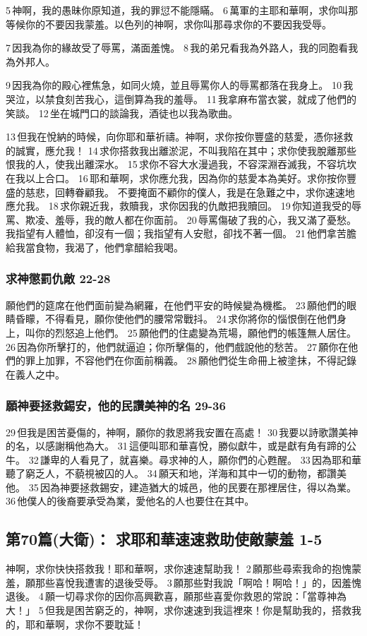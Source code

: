 5 神啊，我的愚昧你原知道，我的罪愆不能隱瞞。
6 萬軍的主耶和華啊，求你叫那等候你的不要因我蒙羞。以色列的神啊，求你叫那尋求你的不要因我受辱。

7 因我為你的緣故受了辱罵，滿面羞愧。
8 我的弟兄看我為外路人，我的同胞看我為外邦人。

9 因我為你的殿心裡焦急，如同火燒，並且辱罵你人的辱罵都落在我身上。
10 我哭泣，以禁食刻苦我心，這倒算為我的羞辱。
11 我拿麻布當衣裳，就成了他們的笑談。
12 坐在城門口的談論我，酒徒也以我為歌曲。


13 但我在悅納的時候，向你耶和華祈禱。神啊，求你按你豐盛的慈愛，憑你拯救的誠實，應允我！
14 求你搭救我出離淤泥，不叫我陷在其中；求你使我脫離那些恨我的人，使我出離深水。
15 求你不容大水漫過我，不容深淵吞滅我，不容坑坎在我以上合口。
16 耶和華啊，求你應允我，因為你的慈愛本為美好。求你按你豐盛的慈悲，回轉眷顧我。
不要掩面不顧你的僕人，我是在急難之中，求你速速地應允我。
18 求你親近我，救贖我，求你因我的仇敵把我贖回。
19 你知道我受的辱罵、欺凌、羞辱，我的敵人都在你面前。
20 辱罵傷破了我的心，我又滿了憂愁。我指望有人體恤，卻沒有一個；我指望有人安慰，卻找不著一個。
21 他們拿苦膽給我當食物，我渴了，他們拿醋給我喝。
\subsubsection{求神懲罰仇敵 22-28}
願他們的筵席在他們面前變為網羅，在他們平安的時候變為機檻。
23 願他們的眼睛昏矇，不得看見，願你使他們的腰常常戰抖。
24 求你將你的惱恨倒在他們身上，叫你的烈怒追上他們。
25 願他們的住處變為荒場，願他們的帳篷無人居住。
26 因為你所擊打的，他們就逼迫；你所擊傷的，他們戲說他的愁苦。
27 願你在他們的罪上加罪，不容他們在你面前稱義。
28 願他們從生命冊上被塗抹，不得記錄在義人之中。
\subsubsection{願神要拯救錫安，他的民讚美神的名 29-36}
29 但我是困苦憂傷的，神啊，願你的救恩將我安置在高處！
30 我要以詩歌讚美神的名，以感謝稱他為大。
31 這便叫耶和華喜悅，勝似獻牛，或是獻有角有蹄的公牛。
32 謙卑的人看見了，就喜樂。尋求神的人，願你們的心甦醒。
33 因為耶和華聽了窮乏人，不藐視被囚的人。
34 願天和地，洋海和其中一切的動物，都讚美他。
35 因為神要拯救錫安，建造猶大的城邑，他的民要在那裡居住，得以為業。
36 他僕人的後裔要承受為業，愛他名的人也要住在其中。


\subsection{第70篇(大衛)： 求耶和華速速救助使敵蒙羞 1-5}
神啊，求你快快搭救我！耶和華啊，求你速速幫助我！
2 願那些尋索我命的抱愧蒙羞，願那些喜悅我遭害的退後受辱。
3 願那些對我說「啊哈！啊哈！」的，因羞愧退後。
4 願一切尋求你的因你高興歡喜，願那些喜愛你救恩的常說：「當尊神為大！」
5 但我是困苦窮乏的，神啊，求你速速到我這裡來！你是幫助我的，搭救我的，耶和華啊，求你不要耽延！

